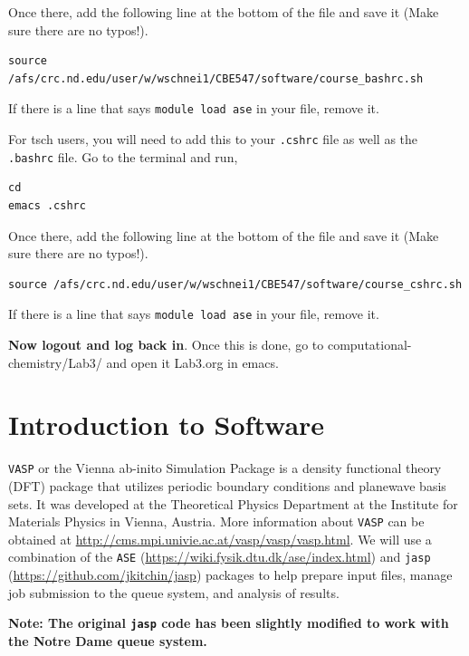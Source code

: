 \documentclass[11pt]{article}
\begin{document}
Once there, add the following line at the bottom of the file and save it (Make sure there are no typos!).

\begin{verbatim}
source /afs/crc.nd.edu/user/w/wschnei1/CBE547/software/course_bashrc.sh
\end{verbatim}

If there is a line that says \verb~module load ase~ in your file, remove it.

For tsch users, you will need to add this to your \texttt{.cshrc} file as well as the \texttt{.bashrc} file. Go to the terminal and run,

\begin{verbatim}
cd
emacs .cshrc
\end{verbatim}

Once there, add the following line at the bottom of the file and save it (Make sure there are no typos!). 

\begin{verbatim}
source /afs/crc.nd.edu/user/w/wschnei1/CBE547/software/course_cshrc.sh
\end{verbatim}

If there is a line that says \verb~module load ase~ in your file, remove it.

\textbf{Now logout and log back in}. Once this is done, go to computational-chemistry/Lab3/ and open it Lab3.org in emacs.


\section{Introduction to Software}
\label{sec-3}

\texttt{VASP} or the Vienna ab-inito Simulation Package is a density functional theory (DFT) package that utilizes periodic boundary conditions and planewave basis sets. It was developed at the Theoretical Physics Department at the Institute for Materials Physics in Vienna, Austria. More information about \texttt{VASP} can be obtained at \url{http://cms.mpi.univie.ac.at/vasp/vasp/vasp.html}. We will use a combination of the \texttt{ASE} (\url{https://wiki.fysik.dtu.dk/ase/index.html}) and \texttt{jasp} (\url{https://github.com/jkitchin/jasp}) packages to help prepare input files, manage job submission to the queue system, and analysis of results.  

\textbf{Note: The original \texttt{jasp} code has been slightly modified to work with the Notre Dame queue system.}
\end{document}
